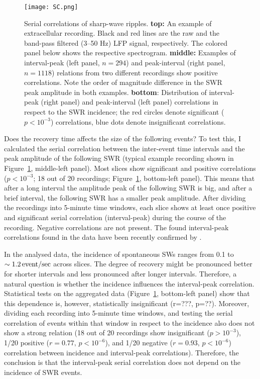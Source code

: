     \begin{figure}
      \centering
      \texttt{[image: SC.png]}
      \caption{Serial correlations of sharp-wave ripples.
        \textbf{top:} An example of extracellular recording. Black and red lines
        are the raw and the band-pass filtered (3--50 Hz) LFP signal,
        respectively. The colored panel below shows the respective spectrogram.
        \textbf{middle:} Examples of interval-peak (left panel, $n=294$) and peak-interval
        (right panel, $n=1118$) relations from two different recordings show positive
        correlations. Note the order of magnitude difference in the SWR peak
        amplitude in both examples.
        \textbf{bottom}: Distribution of interval-peak (right panel) and
        peak-interval (left panel) correlations in respect to the SWR
        incidence; the red circles denote significant ($p<10^{-3}$)
        correlations, blue dots denote insignificant correlations.
             }
      \label{fig:sc}
    \end{figure}
  
    Does the recovery time affects the size of the following events? To test
    this, I calculated the serial correlation between the inter-event time
    intervals and the peak amplitude of the following SWR (typical example
    recording shown in Figure~\ref{fig:sc}, middle-left panel). Most slices
    show significant and positive correlations ($p<10^{-3}$; 18 out of 20
    recordings; Figure~\ref{fig:sc}, bottom-left panel). This means that after
    a long interval the amplitude peak of the following SWR is big, and after a
    brief interval, the following SWR has a smaller peak amplitude. After
    dividing the recordings into 5-minute time windows, each slice shows at
    least once positive and significant serial correlation (interval-peak)
    during the course of the recording. Negative correlations are not present.
    The found interval-peak correlations found in the data have been recently
    confirmed by \cite{Kohus2016}.

    In the analysed data, the incidence of spontaneous SWs ranges from 0.1 to
    $\sim 1.2 \,\rm event/sec$ across slices. The degree of recovery might be
    pronounced better for shorter intervals and less pronounced after longer
    intervals. Therefore, a natural question is whether the incidence
    influences the interval-peak correlation. Statistical tests on the
    aggregated data (Figure~\ref{fig:sc}, bottom-left panel) show that this
    dependence is, however, statistically insignificant (r=???, p=??). Moreover,
    dividing each recording into 5-minute time windows, and testing the serial
    correlation of events within that window in respect to the incidence also
    does not show a strong relation (18 out of 20 recordings show insignificant
    ($p>10^{-3}$), 1/20 positive ($r=0.77 ,\, p<10^{-6}$), and 1/20 negative
    ($r=0.93,\,p<10^{-6}$) correlation between incidence and interval-peak
    correlations). Therefore, the conclusion is that the interval-peak serial
    correlation does not depend on the incidence of SWR events.

